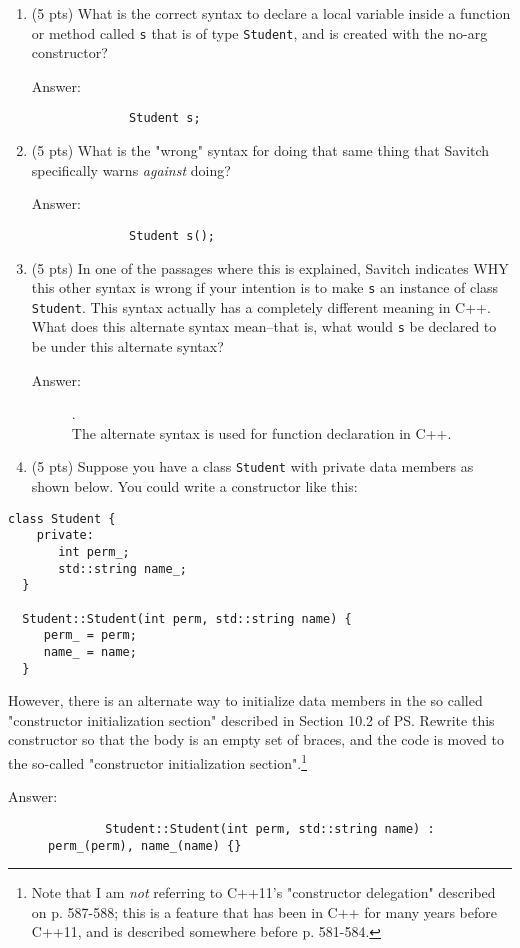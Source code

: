 \documentclass[11pt]{article}
\begin{document}
\begin{enumerate}
\item (5 pts) What is the correct syntax to declare a local variable inside a function or method called \texttt{s} that is of type \texttt{Student}, and is created with the no-arg constructor?
\begin{description}
    \item[Answer:]
    \begin{verbatim}
        Student s;
    \end{verbatim}
\end{description}
\item (5 pts) What is the "wrong" syntax for doing that same thing that Savitch specifically warns \emph{against} doing?
\begin{description}
    \item[Answer:]
    \begin{verbatim}
        Student s();
    \end{verbatim}
\end{description}
\item (5 pts) In one of the passages where this is explained, Savitch indicates WHY this other syntax is wrong if your intention is to make \texttt{s} an instance of class \texttt{Student}.  This syntax actually has a completely different meaning in C++. What does this alternate syntax mean--that is, what would \texttt{s} be declared to be under this alternate syntax?
\begin{description}
    \item[Answer:] .\\
    The alternate syntax is used for function declaration in C++.
\end{description}

\item (5 pts) Suppose you have a class \texttt{Student} with private data members as shown below. You could write a constructor like this:
\end{enumerate}
\begin{verbatim}
class Student {
    private:
       int perm_;
       std::string name_;
  }

  Student::Student(int perm, std::string name) {
     perm_ = perm;
     name_ = name;
  }
\end{verbatim}

However, there is an alternate way to initialize data members in the
so called "constructor initialization section" described in Section
10.2 of PS. Rewrite this constructor so that the body is an empty set
of braces, and the code is moved to the so-called "constructor
initialization section".\footnote{Note that I am \emph{not} referring to C++11's
"constructor delegation" described on p. 587-588; this is a feature
that has been in C++ for many years before C++11, and is described
somewhere before p. 581-584.}

\begin{description}
    \item[Answer:]
    \begin{verbatim}
        Student::Student(int perm, std::string name) : perm_(perm), name_(name) {}
    \end{verbatim}
\end{description}
\end{document}
